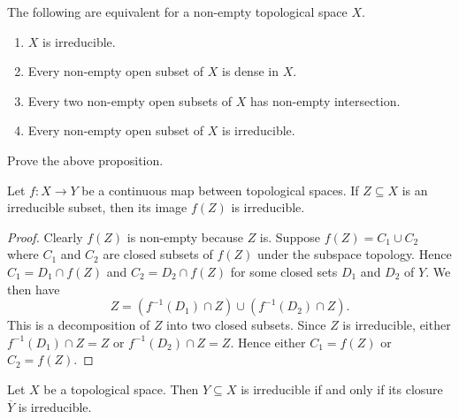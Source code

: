 \begin{proposition}
	The following are equivalent for a non-empty topological space $X$.
	\begin{enumerate}
		\item $X$ is irreducible.
		
		\item Every non-empty open subset of $X$ is dense in $X$.
		
		\item Every two non-empty open subsets of $X$ has non-empty intersection.
		
		\item Every non-empty open subset of $X$ is irreducible.
	\end{enumerate}
\end{proposition}

\begin{exercise}
	Prove the above proposition.
\end{exercise}

\begin{proposition}
	Let $f\colon X \to Y$ be a continuous map between topological spaces. If $Z \subseteq X$ is an irreducible subset, then its image $f(Z)$ is irreducible.
\end{proposition}

\begin{proof}
	Clearly $f(Z)$ is non-empty because $Z$ is. Suppose $f(Z) = C_1 \cup C_2$ where $C_1$ and $C_2$ are closed subsets of $f(Z)$ under the subspace topology. Hence $C_1 = D_1 \cap f(Z)$ and $C_2 = D_2 \cap f(Z)$ for some closed sets $D_1$ and $D_2$ of $Y$. We then have
	\begin{equation*}
		Z = (f^{-1}(D_1) \cap Z) \cup (f^{-1}(D_2) \cap Z).
	\end{equation*}
	This is a decomposition of $Z$ into two closed subsets. Since $Z$ is irreducible, either $f^{-1}(D_1) \cap Z = Z$ or $f^{-1}(D_2) \cap Z = Z$. Hence either $C_1 = f(Z)$ or $C_2 = f(Z)$.		
\end{proof}

\begin{proposition}\label{chap2:space-irreducible-iff-closure-irreducible}
	Let $X$ be a topological space. Then $Y\subseteq X$ is irreducible if and only if its closure $\overline{Y}$ is irreducible.
\end{proposition}

